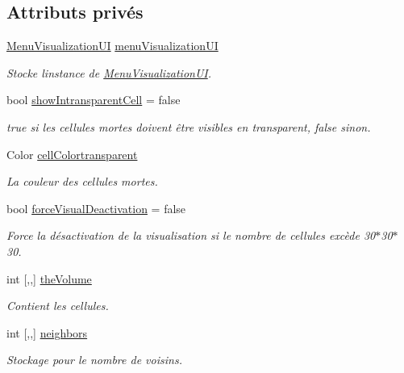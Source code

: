\subsection*{Attributs privés}
\begin{DoxyCompactItemize}
\item 
\mbox{\hyperlink{class_menu_visualization_u_i}{Menu\+Visualization\+UI}} \mbox{\hyperlink{class_simulation_affdff461f776f637b6439c04b0984fac}{menu\+Visualization\+UI}}
\begin{DoxyCompactList}\small\item\em Stocke l\textquotesingle{}instance de \mbox{\hyperlink{class_menu_visualization_u_i}{Menu\+Visualization\+UI}}. \end{DoxyCompactList}\item 
bool \mbox{\hyperlink{class_simulation_a435bb7cb51e9dcf9f05a233e733ce451}{show\+Intransparent\+Cell}} = false
\begin{DoxyCompactList}\small\item\em true si les cellules mortes doivent être visibles en transparent, false sinon. \end{DoxyCompactList}\item 
Color \mbox{\hyperlink{class_simulation_ab3fa246ee311f9d4dc8a02d72e9e4b0b}{cell\+Colortransparent}}
\begin{DoxyCompactList}\small\item\em La couleur des cellules mortes. \end{DoxyCompactList}\item 
bool \mbox{\hyperlink{class_simulation_a8fd619d4dd151c7eed091395f794af25}{force\+Visual\+Deactivation}} = false
\begin{DoxyCompactList}\small\item\em Force la désactivation de la visualisation si le nombre de cellules excède 30$\ast$30$\ast$30. \end{DoxyCompactList}\item 
int \mbox{[},,\mbox{]} \mbox{\hyperlink{class_simulation_aee1ef7a6608f40a4ba30d431b10f83c6}{the\+Volume}}
\begin{DoxyCompactList}\small\item\em Contient les cellules. \end{DoxyCompactList}\item 
int \mbox{[},,\mbox{]} \mbox{\hyperlink{class_simulation_a3db898e7c26628b180538fd3f5fbefe7}{neighbors}}
\begin{DoxyCompactList}\small\item\em Stockage pour le nombre de voisins. \end{DoxyCompactList}\item 

\end{DoxyCompactItemize}
